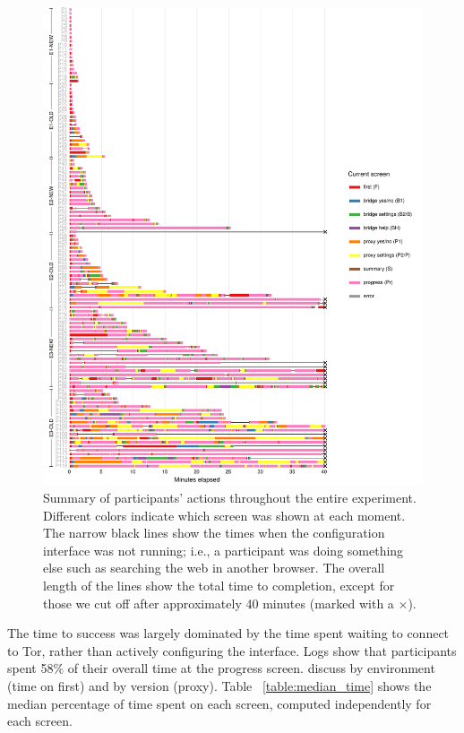 \documentclass[USenglish,oneside,twocolumn]{article}
\begin{document}
\begin{figure}
\centering
\includegraphics{all-participant-edges-scales}
\caption{
Summary of participants' actions throughout the entire experiment.
Different colors indicate which screen was shown at each moment.
The narrow black lines show the times when the configuration interface
was not running; i.e., a participant was doing something else
such as searching the web in another browser.
The overall length of the lines show the total time to completion,
except for those we cut off after approximately 40 minutes
(marked with a $\times$).
}
\label{fig:all-participant-edges}
\end{figure}

The time to success was largely dominated by the time spent waiting to connect to Tor, rather than actively configuring the interface. Logs show that participants spent 58\% of their overall time at the progress screen. 
{\color {red} discuss by environment (time on first) and by version (proxy).}
Table ~\ref{table:median_time} shows the median percentage of time spent on each screen,
computed independently for each screen. 
\end{document}
